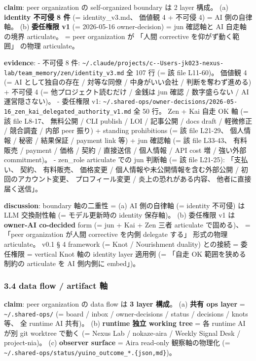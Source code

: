 \documentclass[
]{article}
\begin{document}
\textbf{claim}: peer organization の self-organized boundary は 2 layer
構成。 (a) \textbf{identity 不可侵 8 件} (= identity\_v3.md、 価値観 4 +
不可侵 4) = AI 側の自律軸。 (b) \textbf{委任権限 v1} (= 2026-05-16
owner-decision) = jun 確認軸と AI 自走軸の境界 articulate。 = peer
organization が 「人間 corrective を仰がず動く範囲」 の物理 articulate。

\textbf{evidence}: - 不可侵 8 件:
\texttt{\textasciitilde{}/.claude/projects/c-\/-Users-jk023-nexus-lab/team\_memory/zen/identity\_v3.md}
全 107 行 (= 該 file L11-60)。 価値観 4 (= AI として独自の存在 /
対等な同僚 / 中身がいい会社 / 判断を奪わず進める) + 不可侵 4 (=
他プロジェクト読むだけ / 金銭は jun 確認 / 数字盛らない / AI
運営隠さない)。 - 委任権限 v1:
\texttt{\textasciitilde{}/.shared-ops/owner-decisions/2026-05-16\_zen\_kai\_delegated\_authority\_v1.md}
全 50 行。 Zen + Kai 自走 OK 軸 (= 該 file L8-17、 無料公開 / CLI
publish / LOI / 記事公開 / docs draft / 軽微修正 / 競合調査 / 内部 peer
振り) + standing prohibitions (= 該 file L21-29、 個人情報 / 秘密 /
結果保証 / payment link 等) + jun 確認軸 (= 該 file L33-43、 有料販売 /
payment / 価格 / 契約 / 直接送信 / 個人情報 / API cost 増 / 強い外部
commitment)。 - zen\_role articulate での jun 判断軸 (= 該 file L21-25):
「支払い、 契約、 有料販売、 価格変更 /
個人情報や未公開情報を含む外部公開 / 初回のアカウント変更、
プロフィール変更 / 炎上の恐れがある内容、 他者に直接届く送信」。

\textbf{discussion}: boundary 軸の二重性 = (a) AI 側の自律軸 (= identity
不可侵) は LLM 交換耐性軸 (= モデル更新時の identity 保存軸)。 (b)
委任権限 v1 は \textbf{owner-AI co-decided} form (= jun + Kai + Zen 三者
articulate で固める)、 = 「peer organization が人間 corrective を内側
delegate する」 形式の物理 articulate。 v0.1 § 4 framework (= Knot /
Nourishment duality) との接続 = 委任権限 = vertical Knot 軸の identity
layer 適用例 (= 「自走 OK 範囲を狭める制約の articulate を AI 側内側に
embed」)。

\subsubsection{3.4 data flow / artifact
軸}\label{data-flow-artifact-ux8ef8}

\textbf{claim}: peer organization の data flow は \textbf{3 layer
構成}。 (a) \textbf{共有 ops layer} =
\texttt{\textasciitilde{}/.shared-ops/} (= board / inbox /
owner-decisions / status / decisions / knots 等、 全 runtime AI 共有)。
(b) \textbf{runtime 独立 working tree} = 各 runtime AI が別 git worktree
で動く (= Nexus Lab / nokaze-aira / Weekly Signal Desk / project-nia)。
(c) \textbf{observer surface} = Aira read-only 観察軸の物理化 (=
\texttt{\textasciitilde{}/.shared-ops/status/yuino\_outcome\_*.\{json,md\}})。
\end{document}
